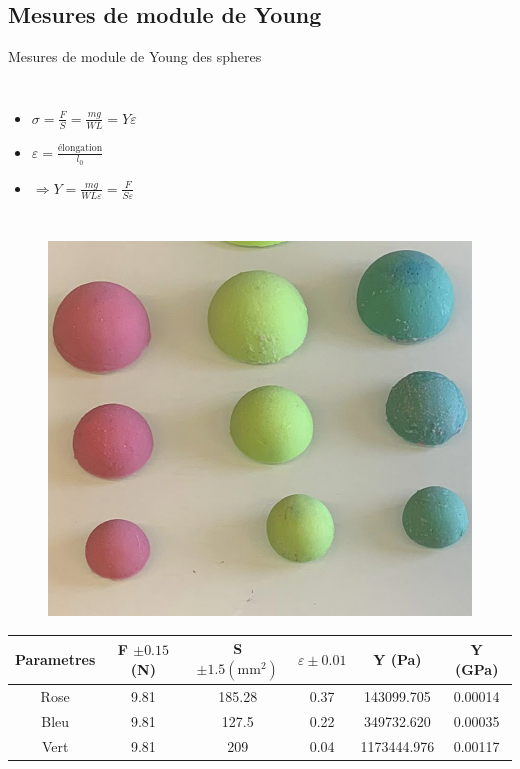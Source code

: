 \documentclass[aspectratio=169,xcolor=dvipsnames]{beamer}
\begin{document}
\subsection{Mesures de module de Young}
\begin{frame}{Mesures de module de Young des spheres}
    \begin{columns}
            
            \begin{itemize}
                \item \(\sigma = \frac{F}{S} = \frac{mg}{WL} = Y\varepsilon\)
                \item \(\varepsilon = \frac{\mathrm{élongation}}{l_0}\)
                \item \(\Longrightarrow Y = \frac{mg}{WL\varepsilon} = \frac{F}{S\varepsilon}\)
            \end{itemize}
        \end{columns}
\end{frame}

\begin{frame}
    \begin{figure}      %
        \includegraphics[width = .3\textwidth]{Screenshot 2022-12-06 011933.png}
    \end{figure}
    \begin{table}[h]
        \centering
        \begin{tabular}{cccccc}
        \toprule
        \textbf{Parametres} & {F $\pm 0.15$ (N)} & {S \(\pm 1.5(\mathrm{mm}^2)\)} & {$\varepsilon \pm 0.01$} & {Y (Pa)} & {Y (GPa)} \\
        \midrule                                
        \rowcolor{red!10}
        Rose & 9.81 & 185.28 & 0.37 & 143099.705 & 0.00014 \\
        \rowcolor{blue!10}
        Bleu & 9.81 & 127.5  & 0.22 & 349732.620 & 0.00035 \\
        \rowcolor{green!10}
        Vert & 9.81 & 209 & 0.04 & 1173444.976 &   0.00117 \\
        \bottomrule
        \end{tabular}
    \end{table}
\end{frame}
\end{document}
